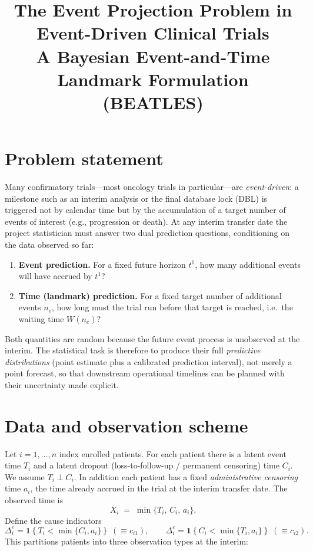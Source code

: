 \documentclass[11pt]{article}
\title{The Event Projection Problem in Event-Driven Clinical Trials\\
\large A Bayesian Event-and-Time Landmark Formulation (BEATLES)}
\author{}
\date{}
\newcommand{\ind}[1]{\mathbf{1}\!\left\{#1\right\}}
\begin{document}
\maketitle

\section{Problem statement}

Many confirmatory trials---most oncology trials in particular---are
\emph{event-driven}: a milestone such as an interim analysis or the final
database lock (DBL) is triggered not by calendar time but by the accumulation
of a target number of events of interest (e.g., progression or death). At any
interim transfer date the project statistician must answer two dual prediction
questions, conditioning on the data observed so far:

\begin{enumerate}[label=(\textbf{Q\arabic*}),leftmargin=*]
  \item \textbf{Event prediction.} For a fixed future horizon
  $t^{1}$, how many additional events will have accrued by $t^{1}$?
  \item \textbf{Time (landmark) prediction.} For a fixed target number of
  additional events $n_{e}$, how long must the trial run before that target
  is reached, i.e.\ the waiting time $W(n_{e})$?
\end{enumerate}

Both quantities are random because the future event process is unobserved at
the interim. The statistical task is therefore to produce their full
\emph{predictive distributions} (point estimate plus a calibrated prediction
interval), not merely a point forecast, so that downstream operational
timelines can be planned with their uncertainty made explicit.

\section{Data and observation scheme}

Let $i = 1,\dots,n$ index enrolled patients. For each patient there is a latent
event time $T_i$ and a latent dropout (loss-to-follow-up / permanent censoring)
time $C_i$. We assume $T_i \perp C_i$. In addition each patient has a fixed
\emph{administrative censoring} time $a_i$, the time already accrued in the
trial at the interim transfer date. The observed time is
\[
X_i \;=\; \min\{T_i,\,C_i,\,a_i\}.
\]
Define the cause indicators
\[
\Delta^{e}_i = \ind{T_i < \min\{C_i,a_i\}} \;(\equiv c_{i1}),
\qquad
\Delta^{c}_i = \ind{C_i < \min\{T_i,a_i\}} \;(\equiv c_{i2}).
\]
This partitions patients into three observation types at the interim:
\end{document}
